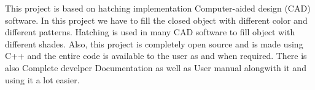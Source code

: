 \begin{Large}
\end{Large}

\noindent This project is based on hatching implementation Computer-aided design (CAD) software.  In this project we have to fill the closed object with different color and different patterns. Hatching is used in many CAD software to fill object with different shades. 
\noindent Also, this project is completely open source and is made using C++ and the entire code is available 
to the user as and when required. There is also Complete develper 
Documentation as well as User manual alongwith it and using it a lot easier.
